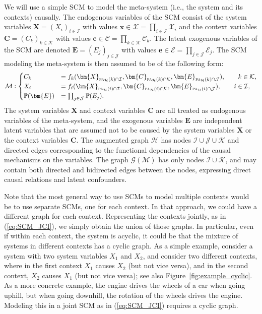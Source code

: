 \documentclass[twoside,11pt]{article}
\newcommand{\Prb}{\mathbb{P}}
\newcommand\B[1]{\bm{#1}}
\newcommand\C[1]{\mathcal{#1}}
\newcommand\BC[1]{\bm{\mathcal{#1}}}
\newcommand\mathbfsc[1]{\text{\normalfont\scshape#1}}
\newcommand\pasub[2]{\mathbfsc{pa}_{#1}(#2)}
\newcommand\eref[1]{(\ref{#1})}
\begin{document}
We will use a simple SCM to model the meta-system (i.e., the system and its contexts) causally.
The endogenous variables of the SCM consist of the system variables $\B{X} = (X_i)_{i\in\C{I}}$ with values 
$\B{x} \in \BC{X} = \prod_{i\in\C{I}} \C{X}_i$ and the context variables $\B{C} = (C_k)_{k\in\C{K}}$ with values $\B{c} \in \BC{C} = \prod_{k\in\C{K}} \C{C}_k$. The latent exogenous variables of the SCM are denoted
$\B{E} = (E_j)_{j\in\C{J}}$ with values $\B{e} \in \BC{E} = \prod_{j\in\C{J}} \C{E}_j$.
The SCM modeling the meta-system is then assumed to be of the following form:
\begin{equation}\label{eq:SCM_JCI}
  \C{M}:
  \begin{cases}
    C_k &= f_k(\B{X}_{\pasub{\C{H}}{k} \cap \C{I}}, \B{C}_{\pasub{\C{H}}{k} \cap \C{K}}, \B{E}_{\pasub{\C{H}}{k} \cap \C{J}}), \qquad k \in \C{K}, \\
    X_i &= f_i(\B{X}_{\pasub{\C{H}}{i} \cap \C{I}}, \B{C}_{\pasub{\C{H}}{i} \cap \C{K}}, \B{E}_{\pasub{\C{H}}{i} \cap \C{J}}), \qquad i \in \C{I},\\
    \Prb(\B{E}) & = \prod_{j\in\C{J}} \Prb(E_j).
  \end{cases}
\end{equation}
The system variables $\B{X}$ and context variables $\B{C}$ are all treated as endogenous variables of the meta-system, and
the exogenous variables $\B{E}$ are independent latent variables that are assumed 
not to be caused by the system variables $\B{X}$ or the context variables $\B{C}$. 
The augmented graph $\C{H}$ has nodes 
$\C{I} \cup \C{J} \cup \C{K}$ and directed edges corresponding to the functional dependencies of the causal
mechanisms on the variables.
The graph $\C{G}(\C{M})$ has only nodes $\C{I} \cup \C{K}$,
and may contain both directed and bidirected edges between the nodes, expressing direct
causal relations and latent confounders.

Note that the most general way to use SCMs to model multiple contexts would be to use
separate SCMs, one for each context.  In that approach, we could have a different 
graph for each context. Representing the contexts jointly, as in \eref{eq:SCM_JCI}, 
we simply obtain the union of those graphs. In particular, even if within each context, the system is acyclic,
it could be that the mixture of systems in different contexts has a cyclic graph.
As a simple example, consider a system with two system variables $X_1$ and $X_2$, and 
consider two different contexts, where in the first context $X_1$ causes $X_2$ (but not vice
versa), and in the second context, $X_2$ causes $X_1$ (but not vice versa); see also Figure~\ref{fig:example_cyclic}.
As a more concrete
example, the engine drives the wheels of a car when going uphill, but when going downhill, 
the rotation of the wheels drives the engine. Modeling this in
a joint SCM as in \eref{eq:SCM_JCI} requires a cyclic graph.
\end{document}
